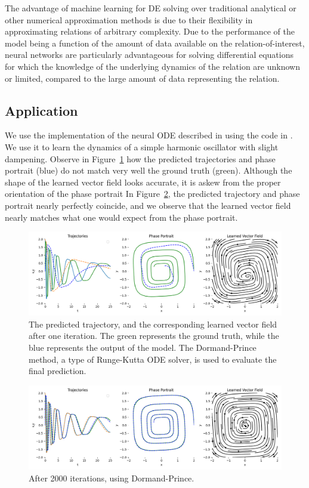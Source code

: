 \documentclass[11pt]{article}
\begin{document}
The advantage of machine learning for DE solving over traditional analytical or other numerical approximation methods is due to their flexibility in approximating relations of arbitrary complexity. Due to the performance of the model being a function of the amount of data available on the relation-of-interest, neural networks are particularly advantageous for solving differential equations for which the knowledge of the underlying dynamics of the relation are unknown or limited, compared to the large amount of data representing the relation.

\subsection{Application}

We use the implementation of the neural ODE described in \cite{chen2018neuralode} using the code in \cite{torchdiffeq}. We use it to learn the dynamics of a simple harmonic oscillator with slight dampening. Observe in Figure~\ref{fig:first_iteration} how the predicted trajectories and phase portrait (blue) do not match very well the ground truth (green). Although the shape of the learned vector field looks accurate, it is askew from the proper orientation of the phase portrait In Figure~\ref{fig:last_iteration}, the predicted trajectory and phase portrait nearly perfectly coincide, and we observe that the learned vector field nearly matches what one would expect from the phase portrait.


\begin{figure}
  \centering
  \includegraphics*[width=\linewidth]{000.png}
  \caption{The predicted trajectory, and the corresponding learned vector field after one iteration. The green represents the ground truth, while the blue represents the output of the model. The Dormand-Prince method, a type of Runge-Kutta ODE solver, is used to evaluate the final prediction.}
  \label{fig:first_iteration}
\end{figure}

\begin{figure}
  \centering
  \includegraphics*[width=\linewidth]{099.png}
  \caption{After 2000 iterations, using Dormand-Prince.}
  \label{fig:last_iteration}
\end{figure}
\end{document}
